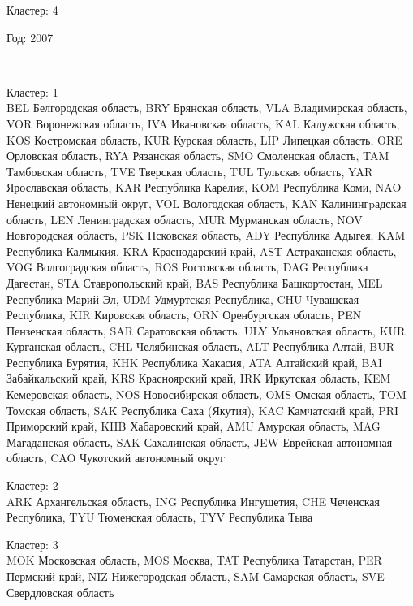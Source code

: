 \documentclass[11pt]{article}
\begin{document}
Кластер:  4 \\

\begin{center}
Год:  2007
\end{center}

    \begin{center}
    \end{center}
    { \hspace*{\fill} \\}
    

Кластер:  1 \\
BEL Белгородская область, BRY Брянская область, VLA Владимирская область, VOR Воронежская область, IVA Ивановская область, KAL Калужская область, KOS Костромская область, KUR Курская область, LIP Липецкая область, ORE Орловская область, RYA Рязанская область, SMO Смоленская область, TAM Тамбовская область, TVE Тверская область, TUL Тульская область, YAR Ярославская область, KAR Республика Карелия, KOM Республика Коми, NAO Ненецкий автономный округ, VOL Вологодская область, KAN Калинингpадская область, LEN Ленинградская область, MUR Мурманская область, NOV Новгородская область, PSK Псковская область, ADY Республика Адыгея, KAM Республика Калмыкия, KRA Краснодарский край, AST Астраханская область, VOG Волгоградская область, ROS Ростовская область, DAG Республика Дагестан, STA Ставропольский край, BAS Республика Башкортостан, MEL Республика Марий Эл, UDM Удмуртская Республика, CHU Чувашская Республика, KIR Кировская область, ORN Оренбургская область, PEN Пензенская область, SAR Саратовская область, ULY Ульяновская область, KUR Курганская область, CHL Челябинская область, ALT Республика Алтай, BUR Республика Бурятия, KHK Республика Хакасия, ATA Алтайский край, BAI Забайкальский край, KRS Красноярский край, IRK Иркутская область, KEM Кемеровская область, NOS Новосибирская область, OMS Омская область, TOM Томская область, SAK Республика Саха (Якутия), KAC Камчатский край, PRI Приморский край, KHB Хабаровский край, AMU Амурская область, MAG Магаданская область, SAK Сахалинская область, JEW Еврейская автономная область, CAO Чукотский автономный округ

Кластер:  2 \\
ARK Архангельская область, ING Республика Ингушетия, CHE Чеченская Республика, TYU Тюменская область, TYV Республика Тыва

Кластер:  3 \\
MOK Московская область, MOS Москва, TAT Республика Татарстан, PER Пермский край, NIZ Нижегородская область, SAM Самарская область, SVE Свердловская область
\end{document}
